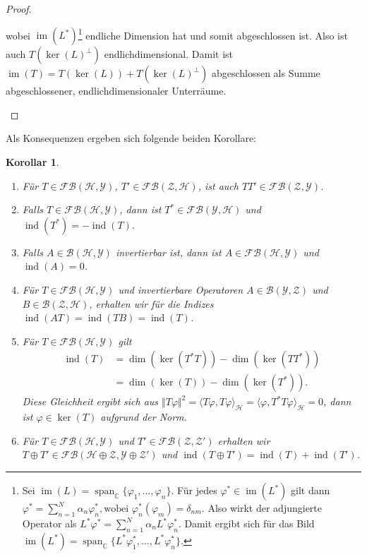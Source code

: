 \documentclass[11pt, hidelinks]{article}
\newcommand{\h}{\mathcal{H}}
\newcommand{\ind}{\operatorname{ind}}
\newcommand{\im}{\operatorname{im}}
\numberwithin{conj}{section}
\newtheorem{corollary}[conj]{Korollar}
\begin{document}
\begin{proof}
\begin{itemize}
    wobei $\im(L^\ast)$\footnote{Sei $\im(L) = \operatorname{span}_\mathbb{C}\{\varphi_1, \dots, \varphi_n\}$. Für jedes \( \varphi^\ast \in \im(L^\ast) \) gilt dann $\varphi^\ast = \sum_{n=1}^N \alpha_n \varphi_n^\ast, \text{wobei } \varphi_n^\ast(\varphi_m) = \delta_{nm}$. Also wirkt der adjungierte Operator als $L^\ast \varphi^\ast = \sum_{n=1}^N \alpha_n L^\ast \varphi_n^\ast$. Damit ergibt sich für das Bild \( \im(L^\ast) = \operatorname{span}_{\mathbb{C}}\{L^\ast \varphi_1^\ast, \dots, L^\ast \varphi_n^\ast\} \).} endliche Dimension hat und somit abgeschlossen ist. Also ist auch $T(\ker(L)^\perp)$ endlichdimensional. Damit ist $\im(T) = T(\ker(L)) + T(\ker(L)^\perp)$ abgeschlossen als Summe abgeschlossener, endlichdimensionaler Unterräume.
\end{itemize}
\end{proof}

Als Konsequenzen ergeben sich folgende beiden Korollare:

\begin{corollary}\noindent
    \begin{enumerate}
        \item Für $T \in \mathcal{FB}(\h,\mathcal{Y})$, $T' \in \mathcal{FB}(\mathcal{Z},\h)$, ist auch $TT'\in \mathcal{FB}(\mathcal{Z},\mathcal{Y})$.
        \item Falls $T \in \mathcal{FB}(\h,\mathcal{Y})$, dann ist $T^\ast \in \mathcal{FB}(\mathcal{Y},\h)$ und $\ind(T^\ast) = - \ind(T)$.
        \item Falls $A \in \mathcal{B}(\h,\mathcal{Y})$ invertierbar ist, dann ist $A \in \mathcal{FB}(\h,\mathcal{Y})$ und $\ind(A) = 0$.
        \item Für $T \in \mathcal{FB}(\h,\mathcal{Y})$ und invertierbare Operatoren $A \in \mathcal{B}(\mathcal{Y},\mathcal{Z})$ und $B \in \mathcal{B}(\mathcal{Z},\h)$, erhalten wir für die Indizes $\ind(AT) = \ind(TB) = \ind(T)$.
        \item Für $T \in \mathcal{FB}(\h,\mathcal{Y})$ gilt
        \begin{align}
            \ind(T) &= \dim(\ker(T^\ast T)) - \dim(\ker(TT^\ast)) \\
                    &= \dim(\ker(T)) - \dim(\ker(T^\ast)).
        \end{align}
        Diese Gleichheit ergibt sich aus $\Vert T\varphi \Vert^2 = \langle T\varphi, T\varphi \rangle_\h = \langle \varphi, T^\ast T\varphi \rangle_\h = 0$, dann ist $\varphi \in \ker(T)$ aufgrund der Norm.
        \item Für $T \in \mathcal{FB}(\h,\mathcal{Y})$ und $T' \in \mathcal{FB}(\mathcal{Z},\mathcal{Z}')$ erhalten wir $T \oplus T' \in \mathcal{FB}(\h \oplus \mathcal{Z}, \mathcal{Y} \oplus \mathcal{Z}')$ und $\ind(T \oplus T') = \ind(T) + \ind(T')$.
    \end{enumerate}
\end{corollary}
\end{document}
